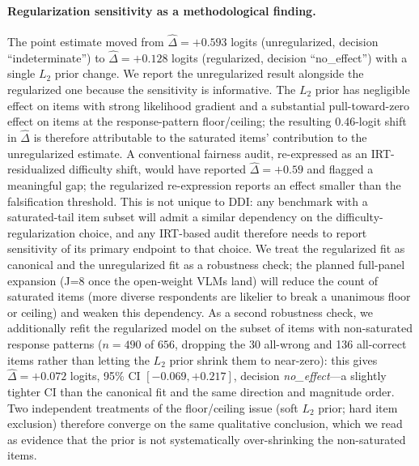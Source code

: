 \documentclass{article}
\begin{document}
\paragraph{Regularization sensitivity as a methodological finding.}
\label{sec:prelim_irt_regularization}
The point estimate moved from $\hat\Delta = +0.593$ logits (unregularized, decision ``indeterminate'') to $\hat\Delta = +0.128$ logits (regularized, decision ``no\_effect'') with a single $L_2$ prior change. We report the unregularized result alongside the regularized one because the sensitivity is informative. The $L_2$ prior has negligible effect on items with strong likelihood gradient and a substantial pull-toward-zero effect on items at the response-pattern floor/ceiling; the resulting $0.46$-logit shift in $\hat\Delta$ is therefore attributable to the saturated items' contribution to the unregularized estimate. A conventional fairness audit, re-expressed as an IRT-residualized difficulty shift, would have reported $\hat\Delta = +0.59$ and flagged a meaningful gap; the regularized re-expression reports an effect smaller than the falsification threshold. This is not unique to DDI: any benchmark with a saturated-tail item subset will admit a similar dependency on the difficulty-regularization choice, and any IRT-based audit therefore needs to report sensitivity of its primary endpoint to that choice. We treat the regularized fit as canonical and the unregularized fit as a robustness check; the planned full-panel expansion (J=8 once the open-weight VLMs land) will reduce the count of saturated items (more diverse respondents are likelier to break a unanimous floor or ceiling) and weaken this dependency. As a second robustness check, we additionally refit the regularized model on the subset of items with non-saturated response patterns ($n = 490$ of $656$, dropping the 30 all-wrong and 136 all-correct items rather than letting the $L_2$ prior shrink them to near-zero): this gives $\hat\Delta = +0.072$ logits, 95\% CI $[-0.069, +0.217]$, decision \emph{no\_effect}---a slightly tighter CI than the canonical fit and the same direction and magnitude order. Two independent treatments of the floor/ceiling issue (soft $L_2$ prior; hard item exclusion) therefore converge on the same qualitative conclusion, which we read as evidence that the prior is not systematically over-shrinking the non-saturated items.
\end{document}
